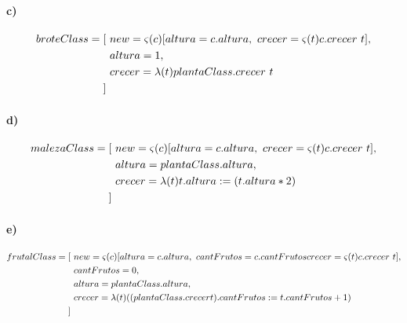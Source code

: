 \documentclass[10pt,a4paper]{article}
\begin{document}
\paragraph{c)}
\begin{align*}
broteClass = [~& new = \varsigma(c)[altura = c.altura,~crecer = \varsigma(t)c.crecer~t], \\
&altura = 1,\\
&crecer = \lambda(t)plantaClass.crecer~t \\
]~&\\
\end{align*}

\paragraph{d)}
\begin{align*}
malezaClass = [~& new = \varsigma(c)[altura = c.altura,~crecer = \varsigma(t)c.crecer~t], \\
&altura = plantaClass.altura,\\
&crecer = \lambda(t)t.altura := (t.altura *2) \\
]~&\\
\end{align*}

\paragraph{e)}
\begin{align*}
frutalClass = [~& new = \varsigma(c)[altura = c.altura,~cantFrutos = c.cantFrutoscrecer = \varsigma(t)c.crecer~t], \\
&cantFrutos = 0, \\
&altura = plantaClass.altura,\\
&crecer = \lambda(t)((plantaClass.crecer t).cantFrutos := t.cantFrutos+1) \\
]~&\\
\end{align*}

\paragraph{}
\end{document}
